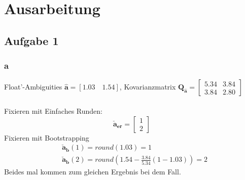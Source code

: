 \chapter{Ausarbeitung}
\section{Aufgabe 1}
\subsection{a}
Float'-Ambiguities $\bm{\hat{a}} = \left[1.03 \quad 1.54\right]$, Kovarianzmatrix $\bm{Q_{\hat{a}}} = \begin{bmatrix}
	5.34 & 3.84 \\
	3.84 & 2.80
\end{bmatrix}$ \\\\
Fixieren mit Einfaches Runden:
\begin{equation*}
	\bm{\check{a}_{er}} = \begin{bmatrix}
		1\\2
	\end{bmatrix}
\end{equation*}
Fixieren mit Bootstrapping
\begin{align*}
	& \bm{\check{a}_{b}}(1) = round(1.03) = 1 \\
	& \bm{\check{a}_{b}}(2) = round(1.54 - \frac{3.84}{5.34}(1 - 1.03)) = 2
\end{align*}
Beides mal kommen zum gleichen Ergebnis bei dem Fall.
